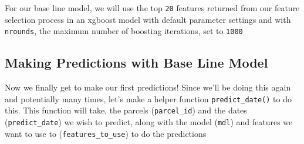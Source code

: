 \documentclass[]{book}
\newenvironment{Shaded}{\begin{snugshade}}{\end{snugshade}}
\newcommand{\KeywordTok}[1]{\textcolor[rgb]{0.13,0.29,0.53}{\textbf{#1}}}
\newcommand{\DataTypeTok}[1]{\textcolor[rgb]{0.13,0.29,0.53}{#1}}
\newcommand{\DecValTok}[1]{\textcolor[rgb]{0.00,0.00,0.81}{#1}}
\newcommand{\StringTok}[1]{\textcolor[rgb]{0.31,0.60,0.02}{#1}}
\newcommand{\OtherTok}[1]{\textcolor[rgb]{0.56,0.35,0.01}{#1}}
\newcommand{\OperatorTok}[1]{\textcolor[rgb]{0.81,0.36,0.00}{\textbf{#1}}}
\newcommand{\NormalTok}[1]{#1}
\theoremstyle{definition}
\theoremstyle{definition}
\theoremstyle{definition}
\theoremstyle{remark}
\begin{document}
For our base line model, we will use the top \texttt{20} features
returned from our feature selection process in an xgboost model with
default parameter settings and with \texttt{nrounds}, the maximum number
of boosting iterations, set to \texttt{1000}

\begin{Shaded}
\end{Shaded}

\subsection{Making Predictions with Base Line
Model}\label{making-predictions-with-base-line-model}

Now we finally get to make our first predictions! Since we'll be doing
this again and potentially many times, let's make a helper function
\texttt{predict\_date()} to do this. This function will take, the
parcels (\texttt{parcel\_id}) and the dates (\texttt{predict\_date}) we
wish to predict, along with the model (\texttt{mdl}) and features we
want to use to (\texttt{features\_to\_use}) to do the predictions
\end{document}
